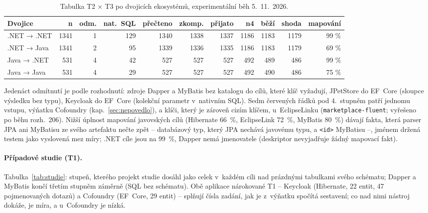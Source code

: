 \documentclass{article}
\begin{document}
\begin{table}[ht]
\centering\small
\setlength{\tabcolsep}{4pt}
\begin{tabular}{l r r r r r r r r r r}
\toprule
\textbf{Dvojice} & \textbf{n} & \textbf{odm.} & \textbf{nat.\ SQL} & \textbf{přečteno} & \textbf{zkomp.} & \textbf{přijato} & \textbf{n4} & \textbf{běží} & \textbf{shoda} & \textbf{mapování} \\
\midrule
.NET → .NET & 1341 & 1 & 129 & 1340 & 1338 & 1337 & 1186 & 1183 & 1179 & 99 \% \\
.NET → Java & 1341 & 2 & 95 & 1339 & 1336 & 1335 & 1186 & 1183 & 1179 & 69 \% \\
Java → .NET & 531 & 4 & 42 & 527 & 527 & 527 & 492 & 489 & 486 & 99 \% \\
Java → Java & 531 & 4 & 29 & 527 & 527 & 527 & 492 & 490 & 486 & 75 \% \\
\bottomrule
\end{tabular}
\caption{Tabulka T2 × T3 po dvojicích ekosystémů, experimentální běh 5.~11.~2026.}
\label{tab:t2t3}
\end{table}

Jedenáct odmítnutí je podle rozhodnutí: zdroje Dapper a MyBatis bez katalogu do cílů, které klíč vyžadují, JPetStore do EF~Core (sloupce výsledku bez typu), Keycloak do EF~Core (kolekční parametr v~nativním SQL). Sedm červených řádků pod 4.~stupněm patří jednomu vstupu, výňatku Cofoundry (kap.~\ref{sec:nepovedlo}), a klíči, který je zároveň cizím klíčem, u~EclipseLinku (\texttt{marketplace-fluent}; vyřešeno po běhu rozh.~206). Nižší úplnost mapování javovských cílů (Hibernate 66~\%, EclipseLink 72~\%, MyBatis 80~\%) dávají fakta, která parser JPA ani MyBatisu ze svého artefaktu nečte zpět -- databázový typ, který JPA nechává javovému typu, a \texttt{<id>} MyBatisu --, jménem držená testem jako vyslovená mez míry; .NET cíle jsou na 99~\%, Dapper nemá jmenovatele (deskriptor nevyjadřuje žádný mapovací fakt).

\paragraph{Případové studie (T1).} Tabulka~\ref{tab:studie}: stupeň, kterého projekt studie dosáhl jako celek v~každém cíli nad prázdnými tabulkami svého schématu; Dapper a MyBatis končí třetím stupněm záměrně (SQL bez schématu). Obě aplikace nárokované T1 -- Keycloak (Hibernate, 22 entit, 47 pojmenovaných dotazů) a Cofoundry (EF~Core, 29 entit) -- splňují čísla zadání, jak je z~výňatku spočítá sestavení; co nad nimi nástroj dokáže, je míra, a u~Cofoundry je nízká.
\end{document}
